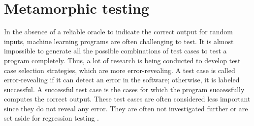 \section{Metamorphic testing}\label{2.2MetamorphicTesting}

In the absence of a reliable oracle to indicate the correct output for random inputs, machine learning programs are often challenging to test. It is almost impossible to generate all the possible combinations of test cases to test a program completely. Thus, a lot of research is being conducted to develop test case selection strategies, which are more error-revealing. A test case is called error-revealing if it can detect an error in the software; otherwise, it is labeled successful. A successful test case is the cases for which the program successfully computes the correct output. These test cases are often considered less important since they do not reveal any error. They are often not investigated further or are set aside for regression testing \cite{Zhou2004, Chen2003}.

